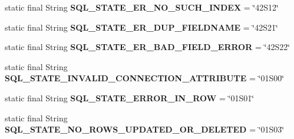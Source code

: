\begin{DoxyCompactItemize}
\item 
\mbox{\label{classcom_1_1mysql_1_1cj_1_1exceptions_1_1_mysql_error_numbers_a0e583869066da9dbb4ecd3d27ec67207}} 
static final String {\bfseries S\+Q\+L\+\_\+\+S\+T\+A\+T\+E\+\_\+\+E\+R\+\_\+\+N\+O\+\_\+\+S\+U\+C\+H\+\_\+\+I\+N\+D\+EX} = \char`\"{}42\+S12\char`\"{}
\item 
\mbox{\label{classcom_1_1mysql_1_1cj_1_1exceptions_1_1_mysql_error_numbers_a4d5c1c640022573d5a3ace021e64a0a1}} 
static final String {\bfseries S\+Q\+L\+\_\+\+S\+T\+A\+T\+E\+\_\+\+E\+R\+\_\+\+D\+U\+P\+\_\+\+F\+I\+E\+L\+D\+N\+A\+ME} = \char`\"{}42\+S21\char`\"{}
\item 
\mbox{\label{classcom_1_1mysql_1_1cj_1_1exceptions_1_1_mysql_error_numbers_a40dcc83c2e3009f14c63ce74e116097d}} 
static final String {\bfseries S\+Q\+L\+\_\+\+S\+T\+A\+T\+E\+\_\+\+E\+R\+\_\+\+B\+A\+D\+\_\+\+F\+I\+E\+L\+D\+\_\+\+E\+R\+R\+OR} = \char`\"{}42\+S22\char`\"{}
\item 
\mbox{\label{classcom_1_1mysql_1_1cj_1_1exceptions_1_1_mysql_error_numbers_a618d3de7fd4230574f3b80d4233bf8ef}} 
static final String {\bfseries S\+Q\+L\+\_\+\+S\+T\+A\+T\+E\+\_\+\+I\+N\+V\+A\+L\+I\+D\+\_\+\+C\+O\+N\+N\+E\+C\+T\+I\+O\+N\+\_\+\+A\+T\+T\+R\+I\+B\+U\+TE} = \char`\"{}01\+S00\char`\"{}
\item 
\mbox{\label{classcom_1_1mysql_1_1cj_1_1exceptions_1_1_mysql_error_numbers_ae03a252510cb6aabe9773f9d562792b2}} 
static final String {\bfseries S\+Q\+L\+\_\+\+S\+T\+A\+T\+E\+\_\+\+E\+R\+R\+O\+R\+\_\+\+I\+N\+\_\+\+R\+OW} = \char`\"{}01\+S01\char`\"{}
\item 
\mbox{\label{classcom_1_1mysql_1_1cj_1_1exceptions_1_1_mysql_error_numbers_a3678dd82c40623eb9d79c56496bce4e1}} 
static final String {\bfseries S\+Q\+L\+\_\+\+S\+T\+A\+T\+E\+\_\+\+N\+O\+\_\+\+R\+O\+W\+S\+\_\+\+U\+P\+D\+A\+T\+E\+D\+\_\+\+O\+R\+\_\+\+D\+E\+L\+E\+T\+ED} = \char`\"{}01\+S03\char`\"{}
\item 

\end{DoxyCompactItemize}
